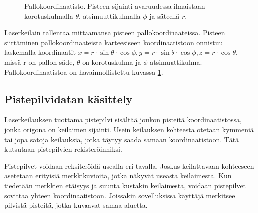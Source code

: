 \begin{figure}
    \centering
    
    \caption{Pallokoordinaatisto. Pisteen sijainti avaruudessa ilmaistaan korotuskulmalla $\theta$, atsimuuttikulmalla $\phi$ ja säteellä $r$.}
    \label{pallo}
\end{figure}{}

Laserkeilain tallentaa mittaamansa pisteen pallokoordinaateissa. Pisteen siirtäminen pallokoordinaateista karteesiseen koordinaatistoon onnistuu laskemalla koordinaatit $x=r \cdot \sin \theta \cdot \cos \phi, y=r \cdot \sin \theta \cdot \cos \phi, z=r \cdot \cos \theta$, missä r on pallon säde, $\theta$ on korotuskulma ja $\phi$ atsimuuttikulma. Pallokoordinaatistoa on havainnollistettu kuvassa \ref{pallo}.

\subsection{Pistepilvidatan käsittely}\label{workflow}

Laserkeilauksen tuottama pistepilvi sisältää joukon pisteitä koordinaatistossa, jonka origona on keilaimen sijainti. Usein keilauksen kohteesta otetaan kymmeniä tai jopa satoja keilauksia, jotka täytyy saada samaan koordinaatistoon. Tätä kutsutaan pistepilvien rekisteröinniksi. 

Pistepilvet voidaan reksiteröidä usealla eri tavalla. Joskus keilattavaan kohteeseen asetetaan erityisiä merkkikuvioita, jotka näkyvät useasta keilaimesta. Kun tiedetään merkkien etäisyys ja suunta kustakin keilaimesta, voidaan pistepilvet sovittaa yhteen koordinaatistoon. Joissakin sovelluksissa käyttäjä merkitsee pilvistä pisteitä, jotka kuvaavat samaa aluetta.

